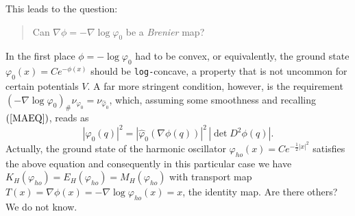 \documentclass[12pt,a4paper,draft]{article}
\begin{document}
This leads to the question: 
\begin{verse}
     Can $\nabla\phi = - \nabla\log{\varphi_0}$ be a {\sl Brenier} map?
\end{verse}
In the first place $\phi=- \log{\varphi_0}$ had to be convex, or equivalently,
the ground state $\varphi_0(x)=C e^{-\phi(x)}$ should be {\tt log-}concave,
a property that is not uncommon for certain potentials $V$. A far more
stringent condition, however, is the requirement 
$(-\nabla\log{\varphi_0})_{\#}\nu_{\varphi_0} = \nu_{\hat\varphi_0}$, which,
assuming some smoothness and recalling $(\ref{MAEQ})$, reads as
\begin{equation}
           |\varphi_0(q)|^2 = |\hat\varphi_0(\nabla\phi(q))|^2\, |\det{D^2\phi(q)}|.
\end{equation}
Actually, the ground state of the harmonic oscillator  
$\varphi_{ho}(x)=C e^{-\frac{1}{2}|x|^2 }$ satisfies the above equation and 
consequently in this particular case we have 
$K_H(\varphi_{ho})=E_H(\varphi_{ho})=M_H(\varphi_{ho})$ with transport map
$T(x)=\nabla\phi(x) = -\nabla\log{\varphi_{ho}(x)}=x$, the identity map.
Are there others? We do not know.
\end{document}

